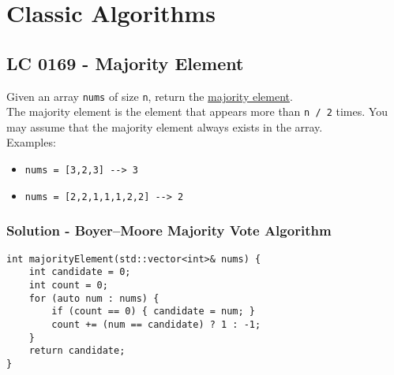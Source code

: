 \chapter{Classic Algorithms}\label{ch:classic_algorithms}
\section{LC 0169 - Majority Element}
Given an array {\colorbox{CodeBackground}{\lstinline|nums|}} of size {\colorbox{CodeBackground}{\lstinline|n|}}, return the \ul{majority element}.\\

The majority element is the element that appears more than {\colorbox{CodeBackground}{\lstinline|n / 2|}} times. You may assume that the majority element always exists in the array.\\

Examples:
\begin{itemize}
	\item {\colorbox{CodeBackground}{\lstinline|nums = [3,2,3] --> 3|}}
	\item {\colorbox{CodeBackground}{\lstinline|nums = [2,2,1,1,1,2,2] --> 2|}}
\end{itemize}

\subsection*{Solution - Boyer–Moore Majority Vote Algorithm}
\begin{lstlisting}
int majorityElement(std::vector<int>& nums) {
	int candidate = 0;
	int count = 0;
	for (auto num : nums) {
		if (count == 0) { candidate = num; }
		count += (num == candidate) ? 1 : -1;
	}
	return candidate;
}
\end{lstlisting}